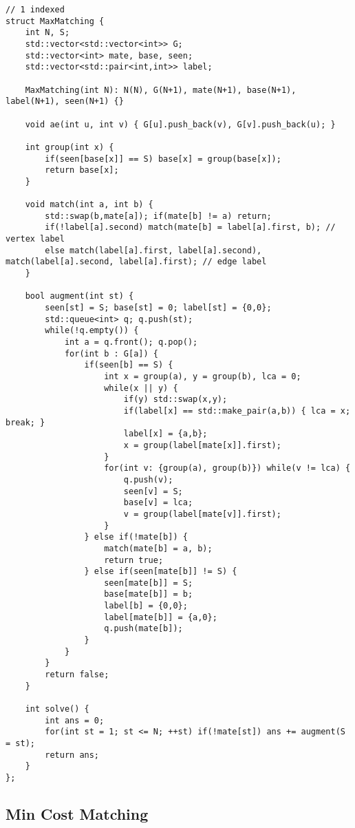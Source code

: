 \documentclass[a4paper,9pt]{article}
\begin{document}
\begin{lstlisting}
// 1 indexed
struct MaxMatching {
	int N, S;
	std::vector<std::vector<int>> G;
	std::vector<int> mate, base, seen;
	std::vector<std::pair<int,int>> label;
	
	MaxMatching(int N): N(N), G(N+1), mate(N+1), base(N+1), label(N+1), seen(N+1) {}
	
	void ae(int u, int v) { G[u].push_back(v), G[v].push_back(u); }
	
	int group(int x) {
		if(seen[base[x]] == S) base[x] = group(base[x]);
		return base[x];
	}
	
	void match(int a, int b) {
		std::swap(b,mate[a]); if(mate[b] != a) return;
		if(!label[a].second) match(mate[b] = label[a].first, b); // vertex label
		else match(label[a].first, label[a].second), match(label[a].second, label[a].first); // edge label
	}
	
	bool augment(int st) {
		seen[st] = S; base[st] = 0; label[st] = {0,0};
		std::queue<int> q; q.push(st);
		while(!q.empty()) {
			int a = q.front(); q.pop();
			for(int b : G[a]) {
				if(seen[b] == S) {
					int x = group(a), y = group(b), lca = 0;
					while(x || y) {
						if(y) std::swap(x,y);
						if(label[x] == std::make_pair(a,b)) { lca = x; break; }
						label[x] = {a,b};
						x = group(label[mate[x]].first);
					}
					for(int v: {group(a), group(b)}) while(v != lca) {
						q.push(v);
						seen[v] = S;
						base[v] = lca;
						v = group(label[mate[v]].first);
					}
				} else if(!mate[b]) {
					match(mate[b] = a, b);
					return true;
				} else if(seen[mate[b]] != S) {
					seen[mate[b]] = S;
					base[mate[b]] = b;
					label[b] = {0,0};
					label[mate[b]] = {a,0};
					q.push(mate[b]);
				}
			}
		}
		return false;
	}
	
	int solve() {
		int ans = 0;
		for(int st = 1; st <= N; ++st) if(!mate[st]) ans += augment(S = st);
		return ans;
	}
};
\end{lstlisting}

\subsection{Min Cost Matching}
\end{document}
